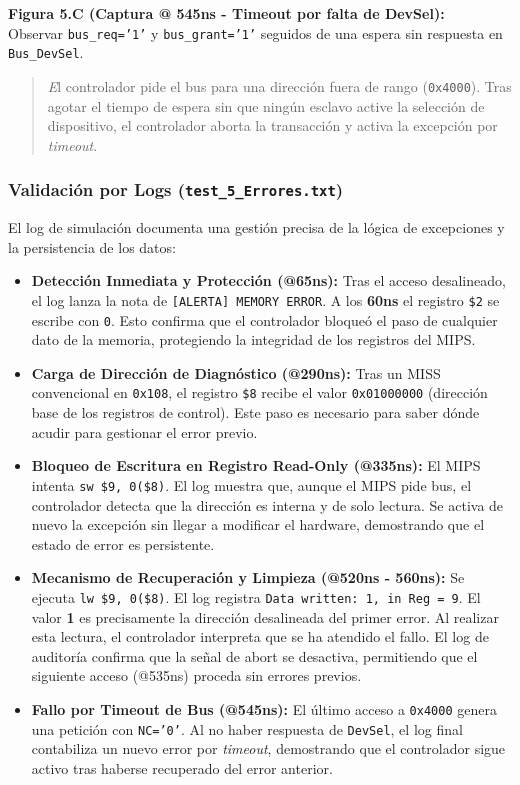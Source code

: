 \documentclass[12pt,a4paper]{article}
\begin{document}
\textbf{Figura 5.C (Captura @ 545ns - Timeout por falta de DevSel):} \\
Observar \texttt{bus\_req='1'} y \texttt{bus\_grant='1'} seguidos de una espera sin respuesta en \texttt{Bus\_DevSel}.
\begin{quote}
    \textit El controlador pide el bus para una dirección fuera de rango (\texttt{0x4000}). Tras agotar el tiempo de espera sin que ningún esclavo active la selección de dispositivo, el controlador aborta la transacción y activa la excepción por \textit{timeout}.
\end{quote}

\subsubsection{Validación por Logs (\texttt{test\_5\_Errores.txt})}

El log de simulación documenta una gestión precisa de la lógica de excepciones y la persistencia de los datos:

\begin{itemize}
    \item \textbf{Detección Inmediata y Protección (@65ns):} Tras el acceso desalineado, el log lanza la nota de \texttt{[ALERTA] MEMORY ERROR}. A los \textbf{60ns} el registro \texttt{\$2} se escribe con \texttt{0}. Esto confirma que el controlador bloqueó el paso de cualquier dato de la memoria, protegiendo la integridad de los registros del MIPS.
    
    \item \textbf{Carga de Dirección de Diagnóstico (@290ns):} Tras un MISS convencional en \texttt{0x108}, el registro \texttt{\$8} recibe el valor \texttt{0x01000000} (dirección base de los registros de control). Este paso es necesario para saber dónde acudir para gestionar el error previo.
    
    \item \textbf{Bloqueo de Escritura en Registro Read-Only (@335ns):} El MIPS intenta \texttt{sw \$9, 0(\$8)}. El log muestra que, aunque el MIPS pide bus, el controlador detecta que la dirección es interna y de solo lectura. Se activa de nuevo la excepción sin llegar a modificar el hardware, demostrando que el estado de error es persistente.
    
    \item \textbf{Mecanismo de Recuperación y Limpieza (@520ns - 560ns):} Se ejecuta \texttt{lw \$9, 0(\$8)}. El log registra \texttt{Data written: 1, in Reg = 9}. El valor \textbf{1} es precisamente la dirección desalineada del primer error. Al realizar esta lectura, el controlador interpreta que se ha atendido el fallo. El log de auditoría confirma que la señal de abort se desactiva, permitiendo que el siguiente acceso (@535ns) proceda sin errores previos.
    
    \item \textbf{Fallo por Timeout de Bus (@545ns):} El último acceso a \texttt{0x4000} genera una petición con \texttt{NC='0'}. Al no haber respuesta de \texttt{DevSel}, el log final contabiliza un nuevo error por \textit{timeout}, demostrando que el controlador sigue activo tras haberse recuperado del error anterior.
\end{itemize}
\end{document}
